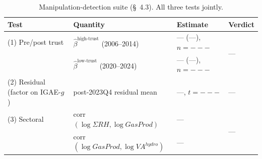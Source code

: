 \begin{table}[H]
\centering
\caption{Manipulation-detection suite (\S~4.3). All three tests jointly.}
\label{tab:manipulation}
\small
\begin{tabular}{llll}
\toprule
Test & Quantity & Estimate & Verdict \\
\midrule
(1) Pre/post trust & $\hat\beta^{\text{high-trust}}$ (2006--2014) &
    --- (---), $n=---$ & \multirow{2}{*}{---} \\
                   & $\hat\beta^{\text{low-trust}}$ (2020--2024) &
    --- (---), $n=---$ & \\
\midrule
(2) Residual (factor on IGAE-$g$) & post-2023Q4 residual mean &
    ---, $t=---$ & --- \\
\midrule
(3) Sectoral & corr$(\log \Sigma\!RH, \log GasProd)$ &
    --- & \multirow{2}{*}{---} \\
             & corr$(\log GasProd, \log VA^{hydro})$ &
    --- & \\
\bottomrule
\end{tabular}
\end{table}
